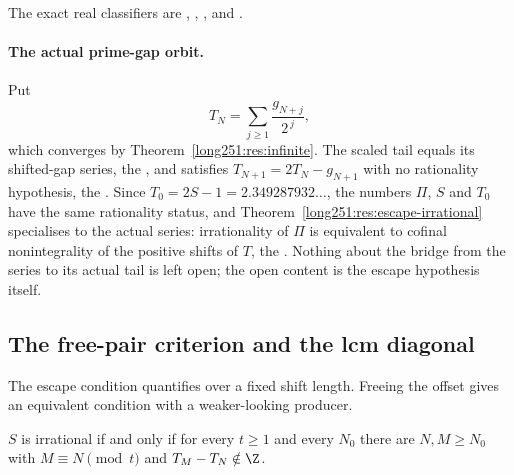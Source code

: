 \documentclass[11pt]{article}
\begin{document}
\noindent The exact real classifiers are
,
,
, and
.

\paragraph{The actual prime-gap orbit.}
Put
\[
 T_N=\sum_{j\ge1}\frac{g_{N+j}}{2^{\,j}},
\]
which converges by Theorem~\ref{long251:res:infinite}.  The scaled tail equals its
shifted-gap series, the
, and satisfies $T_{N+1}=2T_N-g_{N+1}$ with no rationality
hypothesis, the
.  Since $T_0=2S-1=2.349287932\ldots$, the numbers $\Pi$, $S$
and $T_0$ have the same rationality status, and
Theorem~\ref{long251:res:escape-irrational} specialises to the actual series:
irrationality of $\Pi$ is equivalent to cofinal nonintegrality of the positive
shifts of $T$, the
.  Nothing about the bridge from the series to its actual tail is
left open; the open content is the escape hypothesis itself.

\subsection{The free-pair criterion and the lcm diagonal}\label{long251:sec:freepair}

The escape condition quantifies over a fixed shift length.  Freeing the offset
gives an equivalent condition with a weaker-looking producer.

\begin{theorem}\label{long251:res:freepair}
$S$ is irrational if and only if for every $t\ge1$ and every $N_0$ there are
$N,M\ge N_0$ with $M\equiv N\pmod t$ and $T_M-T_N\notin\Z$.
\end{theorem}
\end{document}
